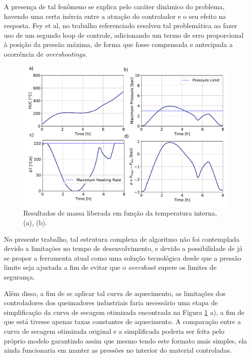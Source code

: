 A presença de tal fenômeno se explica pelo caráter dinâmico do problema, havendo
uma certa inércia entre a atuação do controlador e o seu efeito na resposta. Fey
et al, no trabalho referenciado resolveu tal problemática ao fazer uso de um
segundo loop de controle, adicionando um termo de erro proporcional à posição da
pressão máxima, de forma que fosse compensada e antecipada a ocorrência de {\it
  overshootings}.

\begin{figure}[H]
	\centering
	\includegraphics[width=14cm]{./figures/PID.pdf}
	\caption{Resultados de massa liberada em função da temperatura interna, (a),
    (b).
  \label{fig:PID}}
\end{figure}

No presente trabalho, tal estrutura complexa de algoritmo não foi contemplada
devido a limitações no tempo de desenvolvimento, e devido a possibilidade de já
se propor a ferramenta atual como uma solução tecnológica desde que a pressão
limite seja ajustada a fim de evitar que o {\it overshoot} supere os limites de
segurança.

Além disso, a fim de se aplicar tal curva de aquecimento, as limitações dos
controladores dos queimadores industriais faria necessário uma etapa de
simplificação da curva de secagem otimizada encontrada na Figura \ref{fig:PID}
a), a fim de que está tivesse apenas taxas constantes de aquecimento. A
comparação entre a curva de secagem otimizada original e a simplificada poderia
ser feita pelo próprio modelo garantindo assim que mesmo tendo este formato mais
simples, ela ainda funcionaria em manter as pressões no interior do material
controladas.

